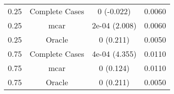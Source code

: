 \begin{table}[ht]
\centering
\begin{tabular}{cccc}
  \hline
  \hline
0.25 & Complete Cases & 0 (-0.022) & 0.0060 \\ 
  0.25 & mcar & 2e-04 (2.008) & 0.0060 \\ 
  0.25 & Oracle & 0 (0.211) & 0.0050 \\ 
  0.75 & Complete Cases & 4e-04 (4.355) & 0.0110 \\ 
  0.75 & mcar & 0 (0.124) & 0.0110 \\ 
  0.75 & Oracle & 0 (0.211) & 0.0050 \\ 
   \hline
\end{tabular}
\end{table}

